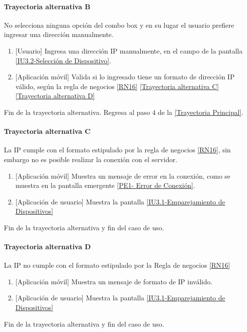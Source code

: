 \paragraph{Trayectoria alternativa B} \label{SUB-U-CU1.4:TB}
	No selecciona ninguna opción del combo box y en su lugar el usuario prefiere ingresar una dirección manualmente.
	\begin{enumerate}[label=B\arabic*.]
		\item {[Usuario]}  Ingresa una dirección IP manualmente, en el campo de la pantalla \hyperref[fig:Seleccion de Disposotivo]{[IU3.2-Selección de Dispositivo]}.
		\item {[Aplicación móvil]} Valida si lo ingresado tiene un formato de dirección IP válido, según la regla de negocios \ref{RN16} \hyperref[SUB-U-CU1.4:TC]{[Trayectoria alternativa C]} \hyperref[SUB-U-CU1.4:TD]{[Trayectoria alternativa D]} 
	\end{enumerate}
	Fin de la trayectoria alternativa. Regresa al paso 4 de la \hyperref[SUB-U-CU1.4:TP]{[Trayectoria Principal]}.

\paragraph{Trayectoria alternativa C} \label{SUB-U-CU1.4:TC}
    La IP cumple con el formato estipulado por la regla de negocios \ref{RN16}, sin embargo no es posible realizar la conexión con el servidor.
    \begin{enumerate}[label=C\arabic*.]
		\item {[Aplicación móvil]} Muestra un mensaje de error en la conexión, como se muestra en la pantalla emergente \hyperref[fig:Error de Conexion]{[PE1- Error de Conexión]}.
		\item {[Aplicación de usuario]} Muestra la pantalla \hyperref[fig:Emparejamiento Dispositivos]{[IU3.1-Emparejamiento de Dispositivos]}
	\end{enumerate}
	Fin de la trayectoria alternativa y fin del caso de uso.
	
\paragraph{Trayectoria alternativa D} \label{SUB-U-CU1.4:TD}
    La IP no cumple con el formato estipulado por la Regla de negocios \ref{RN16}
    \begin{enumerate}[label=D\arabic*.]
		\item {[Aplicación móvil]} Muestra un mensaje de formato de IP inválido.
		\item {[Aplicación de usuario]} Muestra la pantalla \hyperref[fig:Emparejamiento Dispositivos]{[IU3.1-Emparejamiento de Dispositivos]}
	\end{enumerate}
	Fin de la trayectoria alternativa y fin del caso de uso.